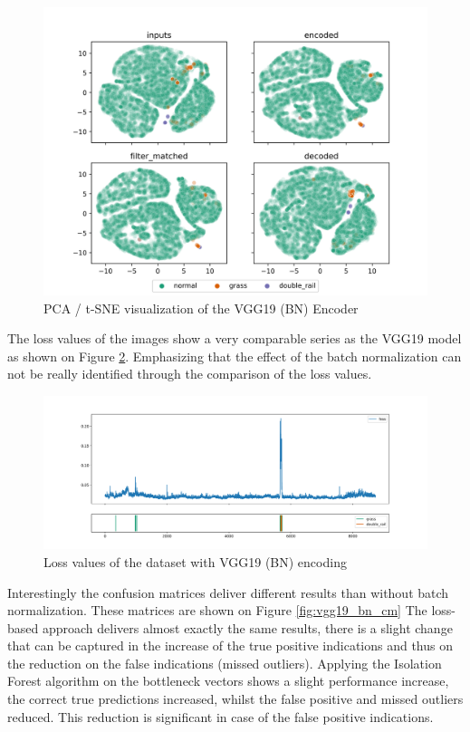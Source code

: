 \begin{figure}[!ht]
    \centering
    \includegraphics[width=\textwidth,trim={0 1cm 0 1cm},clip]{./results/vgg19_bn_vgg19/20230525_045131_feature_vectors_1.png}
    \caption{PCA / t-SNE visualization of the VGG19 (BN) Encoder}
    \label{fig:vgg19_bn_pca}
\end{figure}

The loss values of the images show a very comparable series as the VGG19 model as shown on Figure
\ref{fig:vgg19_bn_loss}.
Emphasizing that the effect of the batch normalization can not be really identified through the
comparison of the loss values.

\begin{figure}[!ht]
    \centering
    \includegraphics[width=\textwidth,trim={0 1cm 0 1cm},clip]{./results/vgg19_bn_vgg19/20230525_045131_feature_vectors_loss.png}
    \caption{Loss values of the dataset with VGG19 (BN) encoding}
    \label{fig:vgg19_bn_loss}
\end{figure}

Interestingly the confusion matrices deliver different results than without batch normalization.
These matrices are shown on Figure \ref{fig:vgg19_bn_cm}
The loss-based approach delivers almost exactly the same results, there is a slight change that can be
captured in the increase of the true positive indications and thus on the reduction
on the false indications (missed outliers).
Applying the Isolation Forest algorithm on the bottleneck vectors shows a slight performance increase,
the correct true predictions increased, whilst the false positive and missed outliers reduced.
This reduction is significant in case of the false positive indications.

